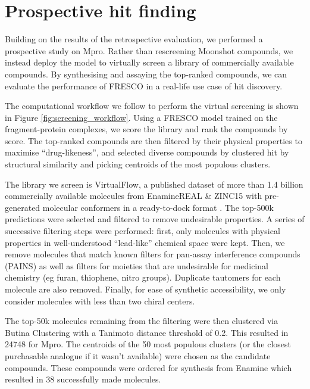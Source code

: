 \section{Prospective hit finding} \label{sec:prospective}

Building on the results of the retrospective evaluation, we performed a prospective study on Mpro. Rather than rescreening Moonshot compounds, we instead deploy the model to virtually screen a library of commercially available compounds. By synthesising and assaying the top-ranked compounds, we can evaluate the performance of FRESCO in a real-life use case of hit discovery.

The computational workflow we follow to perform the virtual screening is shown in Figure \ref{fig:screening_workflow}. Using a FRESCO model trained on the fragment-protein complexes, we score the library and rank the compounds by score. The top-ranked compounds are then filtered by their physical properties to maximise ``drug-likeness'', and selected diverse compounds by clustered hit by structural similarity and picking centroids of the most populous clusters.

The library we screen is VirtualFlow, a published dataset of more than 1.4 billion commercially available molecules from EnamineREAL \& ZINC15 with pre-generated molecular conformers in a ready-to-dock format \cite{Gorgulla2020VirtualFlow}. The top-500k predictions were selected and filtered to remove undesirable properties. A series of successive filtering steps were performed: first, only molecules with physical properties in well-understood ``lead-like'' chemical space \cite{ChemSpace} were kept. Then, we remove molecules that match known filters for pan-assay interference compounds (PAINS) \cite{Baell2010Pains} as well as filters for moieties that are undesirable for medicinal chemistry (eg furan, thiophene, nitro groups). Duplicate tautomers for each molecule are also removed. Finally, for ease of synthetic accessibility, we only consider molecules with less than two chiral centers.

The top-50k molecules remaining from the filtering were then clustered via Butina Clustering \cite{Butina1999Clustering} with a Tanimoto distance threshold of 0.2. This resulted in 24748 for Mpro. The centroids of the 50 most populous clusters (or the closest purchasable analogue if it wasn't available) were chosen as the candidate compounds. These compounds were ordered for synthesis from Enamine which resulted in 38 successfully made molecules.


